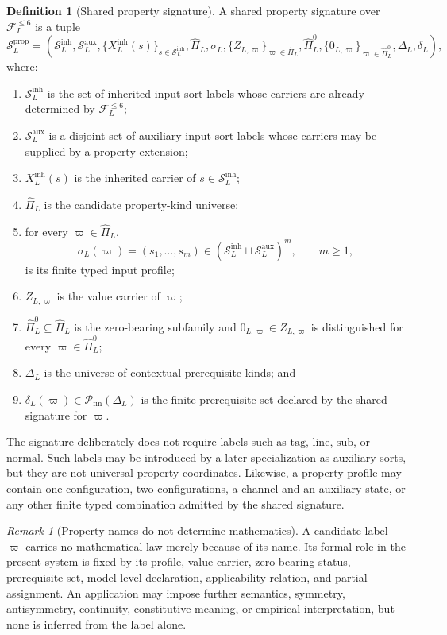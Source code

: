 \documentclass[11pt]{article}
\newcommand{\FVI}{\mathcal F_{L}^{\le 6}}
\newcommand{\Sin}{\mathcal S_{L}^{\mathrm{inh}}}
\newcommand{\Saux}{\mathcal S_{L}^{\mathrm{aux}}}
\newcommand{\Sprop}{\mathcal S_{L}^{\mathrm{prop}}}
\newcommand{\Pihat}{\widehat{\Pi}_{L}}
\newcommand{\PiZero}{\widehat{\Pi}_{L}^{0}}
\newcommand{\Dep}{\Delta_{L}}
\newcommand{\Pfin}{\mathcal P_{\mathrm{fin}}}
\theoremstyle{definition}
\newtheorem{definition}[theorem]{Definition}
\theoremstyle{remark}
\newtheorem{remark}[theorem]{Remark}
\begin{document}
\begin{definition}[Shared property signature]
\label{def:signature}
A shared property signature over \(\FVI\) is a tuple
\[
\Sprop=
\left(
\Sin,\Saux,
\{X_L^{\mathrm{inh}}(s)\}_{s\in\Sin},
\Pihat,\sigma_L,
\{Z_{L,\varpi}\}_{\varpi\in\Pihat},
\PiZero,\{0_{L,\varpi}\}_{\varpi\in\PiZero},
\Dep,\delta_L
\right),
\]
where:
\begin{enumerate}[label=(\arabic*)]
\item \(\Sin\) is the set of inherited input-sort labels whose carriers are already determined by \(\FVI\);
\item \(\Saux\) is a disjoint set of auxiliary input-sort labels whose carriers may be supplied by a property extension;
\item \(X_L^{\mathrm{inh}}(s)\) is the inherited carrier of \(s\in\Sin\);
\item \(\Pihat\) is the candidate property-kind universe;
\item for every \(\varpi\in\Pihat\),
\[
\sigma_L(\varpi)=(s_1,\ldots,s_m)\in(\Sin\sqcup\Saux)^m,
\qquad m\ge 1,
\]
is its finite typed input profile;
\item \(Z_{L,\varpi}\) is the value carrier of \(\varpi\);
\item \(\PiZero\subseteq\Pihat\) is the zero-bearing subfamily and \(0_{L,\varpi}\in Z_{L,\varpi}\) is distinguished for every \(\varpi\in\PiZero\);
\item \(\Dep\) is the universe of contextual prerequisite kinds; and
\item \(\delta_L(\varpi)\in\Pfin(\Dep)\) is the finite prerequisite set declared by the shared signature for \(\varpi\).
\end{enumerate}
\end{definition}

The signature deliberately does not require labels such as \(\mathrm{tag}\), \(\mathrm{line}\), \(\mathrm{sub}\), or \(\mathrm{normal}\).
Such labels may be introduced by a later specialization as auxiliary sorts, but they are not universal property coordinates.
Likewise, a property profile may contain one configuration, two configurations, a channel and an auxiliary state, or any other finite typed combination admitted by the shared signature.

\begin{remark}[Property names do not determine mathematics]
A candidate label \(\varpi\) carries no mathematical law merely because of its name.
Its formal role in the present system is fixed by its profile, value carrier, zero-bearing status, prerequisite set, model-level declaration, applicability relation, and partial assignment.
An application may impose further semantics, symmetry, antisymmetry, continuity, constitutive meaning, or empirical interpretation, but none is inferred from the label alone.
\end{remark}
\end{document}
